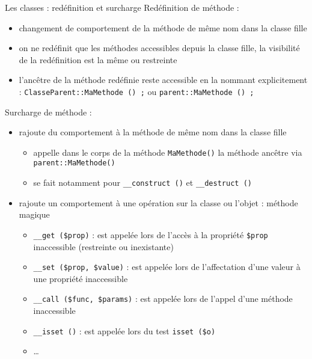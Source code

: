 \begin{frame}[containsverbatim]{Les classes : redéfinition et surcharge}
Redéfinition de méthode :
\begin{itemize}
\item changement de comportement de la méthode de même nom dans la classe fille
\item on ne redéfinit que les méthodes accessibles depuis la classe fille, la visibilité de la redéfinition est la même ou restreinte
\item l'ancêtre de la méthode redéfinie reste accessible en la nommant explicitement : \lstinline!ClasseParent::MaMethode () ;! ou \lstinline!parent::MaMethode () ;!
\end{itemize}
Surcharge de méthode :
\begin{itemize}
\item rajoute du comportement à la méthode de même nom dans la classe fille
\begin{itemize}
	\item appelle dans le corps de la méthode \lstinline!MaMethode()! la méthode ancêtre via \lstinline!parent::MaMethode()!
	\item se fait notamment pour \lstinline!__construct ()! et \lstinline!__destruct ()!
\end{itemize}
\item rajoute un comportement à une opération sur la classe ou l'objet : méthode magique
\begin{itemize}
	\item \lstinline!__get ($prop)! : est appelée lors de l'accès à la propriété \lstinline!$prop! inaccessible (restreinte ou inexistante)
	\item \lstinline!__set ($prop, $value)! : est appelée lors de l'affectation d'une valeur à une propriété inaccessible
	\item \lstinline!__call ($func, $params)! : est appelée lors de l'appel d'une méthode inaccessible
	\item \lstinline!__isset ()! : est appelée lors du test \lstinline!isset ($o)!
	\item \ldots
\end{itemize}
\end{itemize}
\end{frame}

